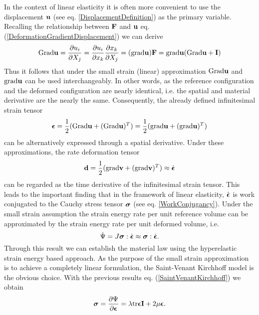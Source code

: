 In the context of linear elasticity it is often more convenient to use the displacement $\mathbf {u} $ (see eq. \ref{DisplacementDefinition}) as the primary variable. Recalling the relationship between $\mathbf {F }$ and $\mathbf {u} $ eq. (\ref{DeformationGradientDisplacement}) we can derive 
 \begin{equation}
 \textnormal{Grad} \mathbf {u}  = \frac{\partial u_i}{\partial X_j} = \frac{\partial u_i}{\partial x_k}  \frac{\partial x_k}{\partial X_j} = ( \textnormal{grad} \mathbf {u} ) \mathbf {F } =  \textnormal{grad} \mathbf {u}  ( \textnormal{Grad} \mathbf {u}  +  \mathbf {I })
\end{equation}
Thus it follows that under the small strain (linear) approximation $ \textnormal{Grad} \mathbf {u} $ and $ \textnormal{grad} \mathbf {u} $ can be used interchangeably. In other words, as the reference configuration and the deformed configuration are nearly identical, i.e. the spatial and material derivative are the nearly the same. Consequently, the already defined infinitesimal strain tensor
 \begin{equation}
\boldsymbol{\epsilon} = \frac{1}{2} ( \textnormal{Grad} \mathbf {u}  + ( \textnormal{Grad} \mathbf {u} )^T) = \frac{1}{2} ( \textnormal{grad} \mathbf {u}  + ( \textnormal{grad} \mathbf {u} )^T)
\end{equation}
can be alternatively expressed through a spatial derivative. Under these approximations, the rate deformation tensor 
 \begin{equation}
\mathbf {d}  = \frac{1}{2} ( \textnormal{grad} \mathbf {v}  + ( \textnormal{grad} \mathbf {v} )^T) \approx \dot{\boldsymbol{\epsilon}}
\end{equation}
can be regarded as the time derivative of the infinitesimal strain tensor. This leads to the important finding that in the framework of linear elasticity, $\dot{\boldsymbol{\epsilon}}$ is work conjugated to the Cauchy stress tensor $\boldsymbol{\sigma}$ (see eq. \ref{WorkConjugancy}). Under the small strain assumption the strain energy rate per unit reference volume can be approximated by the strain energy rate per unit deformed volume, i.e.
 \begin{equation}
\dot {\Psi} = J \boldsymbol{\sigma} : \dot{\boldsymbol{\epsilon}} \approx \boldsymbol{\sigma} : \dot{\boldsymbol{\epsilon}}.
\end{equation}
Through this result we can establish the material law using the hyperelastic strain energy based approach. As the purpose of the small strain approximation is to achieve a completely linear formulation, the Saint-Venant Kirchhoff model is the obvious choice. With the previous results eq. (\ref{SaintVenantKirchhoff}) we obtain
 \begin{equation}
\boldsymbol{\sigma} = \frac{\partial \Psi}{\partial \boldsymbol{\epsilon}} = \lambda \textnormal{tr} {\ensuremath{\boldsymbol{\epsilon}}}  \mathbf {I } + 2 \mu \boldsymbol{\epsilon}   .
\label{LinearMaterialLaw}
\end{equation}

